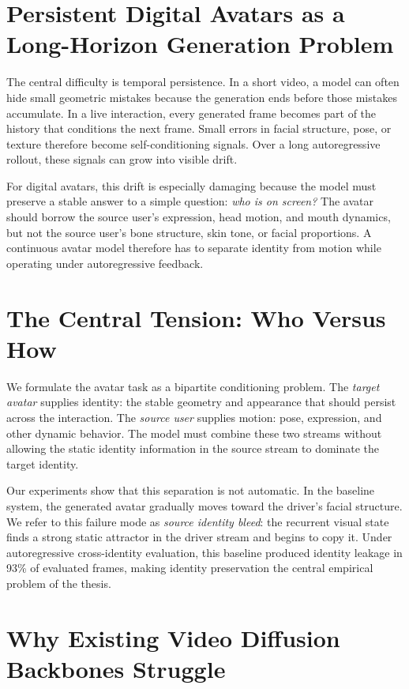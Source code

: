 \documentclass[12pt,letterpaper]{report}
\begin{document}
\section{Persistent Digital Avatars as a Long-Horizon Generation Problem}

The central difficulty is temporal persistence. In a short video, a model can often hide small geometric mistakes because the generation ends before those mistakes accumulate. In a live interaction, every generated frame becomes part of the history that conditions the next frame. Small errors in facial structure, pose, or texture therefore become self-conditioning signals. Over a long autoregressive rollout, these signals can grow into visible drift.

For digital avatars, this drift is especially damaging because the model must preserve a stable answer to a simple question: \emph{who is on screen?} The avatar should borrow the source user's expression, head motion, and mouth dynamics, but not the source user's bone structure, skin tone, or facial proportions. A continuous avatar model therefore has to separate identity from motion while operating under autoregressive feedback.

\section{The Central Tension: Who Versus How}

We formulate the avatar task as a bipartite conditioning problem. The \emph{target avatar} supplies identity: the stable geometry and appearance that should persist across the interaction. The \emph{source user} supplies motion: pose, expression, and other dynamic behavior. The model must combine these two streams without allowing the static identity information in the source stream to dominate the target identity.

Our experiments show that this separation is not automatic. In the baseline system, the generated avatar gradually moves toward the driver's facial structure. We refer to this failure mode as \textit{source identity bleed}: the recurrent visual state finds a strong static attractor in the driver stream and begins to copy it. Under autoregressive cross-identity evaluation, this baseline produced identity leakage in 93\% of evaluated frames, making identity preservation the central empirical problem of the thesis.

\section{Why Existing Video Diffusion Backbones Struggle}
\end{document}
